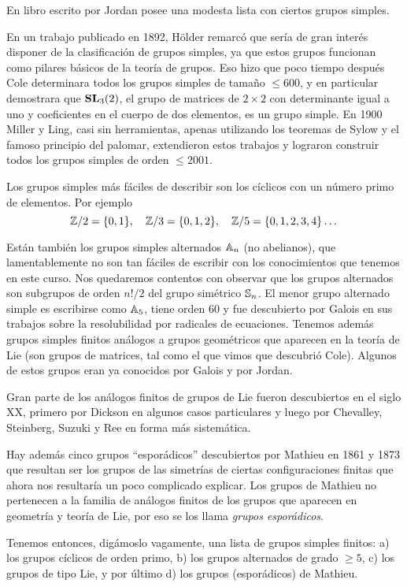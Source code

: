 En libro escrito por Jordan posee una modesta lista 
con ciertos grupos simples. 

En un trabajo
publicado en 1892, H\"older remarcó que sería de gran interés disponer de la
clasificación de grupos simples, ya que estos grupos funcionan como pilares básicos de la teoría de grupos. 
Eso hizo que poco tiempo después Cole determinara todos los grupos simples de tamaño $\leq600$, y en particular
demostrara que $\mathbf{SL}_3(2)$, el grupo de matrices de $2\times 2$ con determinante
igual a uno y coeficientes en el cuerpo de dos elementos, es un grupo simple. En 1900 
Miller y Ling, casi sin herramientas, apenas utilizando los teoremas de Sylow y 
el famoso principio del palomar, 
extendieron estos trabajos y lograron construir todos los grupos
simples de orden $\leq2001$. 

Los grupos simples más fáciles de describir son los cíclicos con un número
primo de elementos. Por ejemplo
\[
	\mathbb{Z}/2=\{0,1\},\quad
	\mathbb{Z}/3=\{0,1,2\},\quad
	\mathbb{Z}/5=\{0,1,2,3,4\}\dots
\]

Están también los grupos simples alternados $\mathbb{A}_n$ (no abelianos), que lamentablemente
no son tan fáciles de escribir con los conocimientos que tenemos 
en este curso. Nos quedaremos contentos
con observar que los grupos alternados son subgrupos de orden $n!/2$ 
del grupo simétrico $\mathbb{S}_n$. El menor grupo alternado simple es 
escribirse como $\mathbb{A}_5$, tiene orden 60 y fue descubierto por Galois en sus trabajos
sobre la resolubilidad por radicales de ecuaciones. Tenemos además grupos simples 
finitos análogos a grupos geométricos que aparecen en la teoría de Lie (son grupos de matrices, tal como el que vimos que descubrió Cole). Algunos
de estos grupos eran ya conocidos por Galois y por Jordan. 

Gran parte de los análogos finitos de grupos de Lie fueron descubiertos en el
siglo XX, primero por Dickson en algunos casos particulares y luego por
Chevalley, Steinberg, Suzuki y Ree en forma más sistemática. 

Hay además cinco grupos ``esporádicos'' descubiertos por Mathieu en 1861 y 1873 que resultan ser los grupos de
las simetrías de ciertas configuraciones finitas que ahora nos resultaría un poco
complicado explicar. Los grupos de Mathieu no pertenecen a la familia de análogos finitos de los grupos que
aparecen en geometría y teoría de Lie, por eso se los llama \emph{grupos esporádicos}. 

Tenemos entonces,
digámoslo vagamente, una lista de grupos simples finitos: a) los grupos
cíclicos de orden primo, b) los grupos alternados de grado $\geq 5$, c) los
grupos de tipo Lie, y por último d) los grupos (esporádicos) de Mathieu. 

